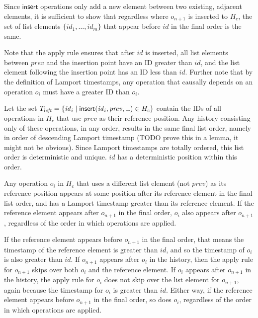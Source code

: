 \documentclass[a4paper,twocolumn,10pt]{article}
\newcommand{\placeholder}{%
  \makebox[0.7em]{%
    \kern.07em
    \vrule height.3ex
    \hrulefill
    \vrule height.3ex
    \kern.07em
  }%
}
\begin{document}
Since $\mathsf{insert}$ operations only add a new element between two existing, adjacent elements, it is sufficient to show that regardless where $o_{n+1}$ is inserted to $H_c$, the set of list elements $\{\mathit{id}_1, \dots, \mathit{id}_m\}$ that appear before $\mathit{id}$ in the final order is the same.

Note that the $\mathrm{apply}$ rule ensures that after $\mathit{id}$ is inserted, all list elements between $\mathit{prev}$ and the insertion point have an ID greater than $\mathit{id}$, and the list element following the insertion point has an ID less than $\mathit{id}$. Further note that by the definition of Lamport timestamps, any operation that causally depends on an operation $o_i$ must have a greater ID than $o_i$.

Let the set $T_\mathit{left} = \{\mathit{id}_i \mid \mathsf{insert}(\mathit{id}_i, \mathit{prev}, \placeholder) \in H_c\}$ contain the IDs of all operations in $H_c$ that use $\mathit{prev}$ as their reference position. Any history consisting only of these operations, in any order, results in the same final list order, namely in order of descending Lamport timestamp (TODO prove this in a lemma, it might not be obvious). Since Lamport timestamps are totally ordered, this list order is deterministic and unique. $\mathit{id}$ has a deterministic position within this order.

Any operation $o_i$ in $H_c$ that uses a different list element (not $\mathit{prev}$) as its reference position appears at some position after its reference element in the final list order, and has a Lamport timestamp greater than its reference element. If the reference element appears after $o_{n+1}$ in the final order, $o_i$ also appears after $o_{n+1}$, regardless of the order in which operations are applied.

If the reference element appears before $o_{n+1}$ in the final order, that means the timestamp of the reference element is greater than $\mathit{id}$, and so the timestamp of $o_i$ is also greater than $\mathit{id}$. If $o_{n+1}$ appears after $o_i$ in the history, then the apply rule for $o_{n+1}$ skips over both $o_i$ and the reference element. If $o_i$ appears after $o_{n+1}$ in the history, the apply rule for $o_i$ does not skip over the list element for $o_{n+1}$, again because the timestamp for $o_i$ is greater than $\mathit{id}$. Either way, if the reference element appears before $o_{n+1}$ in the final order, so does $o_i$, regardless of the order in which operations are applied.
\end{document}

